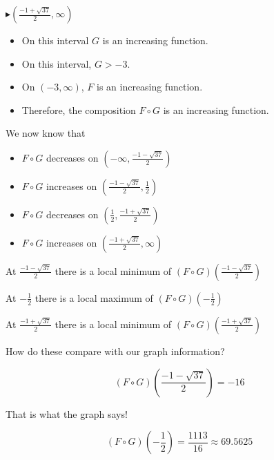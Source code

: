 \documentclass{ximera}
\begin{document}
\begin{example}
\textbf{\textcolor{blue!55!black}{$\blacktriangleright (\frac{-1 + \sqrt{37}}{2}, \infty)$}}


\begin{itemize}
\item On this interval $G$ is an increasing function.
\item On this interval, $G > -3$.
\item On $(-3, \infty)$, $F$ is an increasing function.
\item Therefore, the composition $F \circ G$ is an increasing function.
\end{itemize}





We now know that 

\begin{itemize}
\item $F \circ G$ decreases on $(-\infty, \frac{-1 - \sqrt{37}}{2})$ \\
\item $F \circ G$ increases on $(\frac{-1 - \sqrt{37}}{2}, \frac{1}{2})$ \\
\item $F \circ G$ decreases on $(\frac{1}{2}, \frac{-1 + \sqrt{37}}{2})$ \\
\item $F \circ G$ increases on $(\frac{-1 + \sqrt{37}}{2}, \infty)$
\end{itemize}




At $\frac{-1 - \sqrt{37}}{2}$ there is a local minimum of $(F \circ G)\left( \frac{-1 - \sqrt{37}}{2} \right)$ 


At $-\frac{1}{2}$ there is a local maximum of $(F \circ G)\left( -\frac{1}{2} \right)$ 


At $\frac{-1 + \sqrt{37}}{2}$ there is a local minimum of $(F \circ G)\left( \frac{-1 + \sqrt{37}}{2} \right)$ 




\end{example}



How do these compare with our graph information? 




\[
(F \circ G)\left( \frac{-1 - \sqrt{37}}{2} \right) = -16
\]

That is what the graph says! 






\[
(F \circ G)\left( -\frac{1}{2} \right) = \frac{1113}{16} \approx 69.5625
\]
\end{document}
